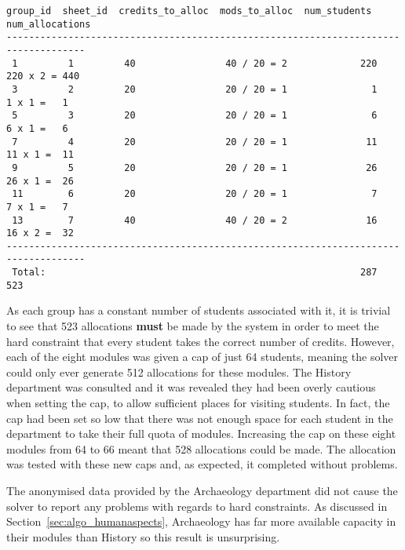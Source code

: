 \begin{Verbatim}[samepage=true]
 group_id  sheet_id  credits_to_alloc  mods_to_alloc  num_students  num_allocations
------------------------------------------------------------------------------------
 1         1         40                40 / 20 = 2             220    220 x 2 = 440
 3         2         20                20 / 20 = 1               1      1 x 1 =   1
 5         3         20                20 / 20 = 1               6      6 x 1 =   6
 7         4         20                20 / 20 = 1              11     11 x 1 =  11
 9         5         20                20 / 20 = 1              26     26 x 1 =  26
 11        6         20                20 / 20 = 1               7      7 x 1 =   7
 13        7         40                40 / 20 = 2              16     16 x 2 =  32
------------------------------------------------------------------------------------
 Total:                                                        287              523
\end{Verbatim}

As each group has a constant number of students associated with it, it is
trivial to see that 523 allocations \textbf{must} be made by the system in
order to meet the hard constraint that every student takes the correct number
of credits. However, each of the eight modules was given a cap of just 64
students, meaning the solver could only ever generate 512 allocations for
these modules. The History department was consulted and it was revealed they
had been overly cautious when setting the cap, to allow sufficient places for
visiting students. In fact, the cap had been set so low that there was not
enough space for each student in the department to take their full quota of
modules. Increasing the cap on these eight modules from 64 to 66 meant that
528 allocations could be made. The allocation was tested with these new caps
and, as expected, it completed without problems.

The anonymised data provided by the Archaeology department did not cause the
solver to report any problems with regards to hard constraints. As discussed
in Section~\ref{sec:algo_humanaspects}, Archaeology has far more available
capacity in their modules than History so this result is unsurprising.


